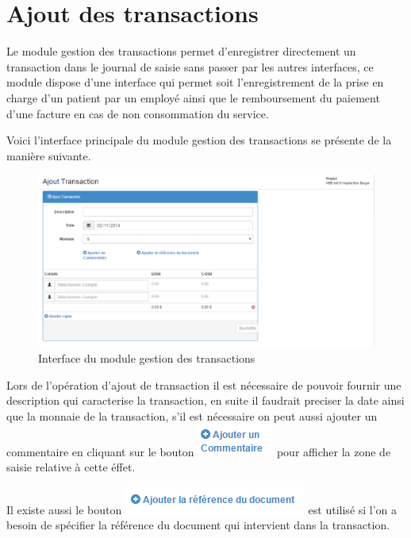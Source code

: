 \documentclass[12pt,a4paper]{report}
\begin{document}
\newpage
\section{Ajout des transactions}

Le module gestion des transactions permet d'enregistrer directement un transaction dans le journal de saisie sans passer par les autres interfaces, ce module dispose d'une interface qui permet soit l'enregistrement de la prise en charge d'un patient par un employé ainsi que le remboursement du paiement d'une facture en cas de non consommation du service.


Voici l'interface principale du module gestion des transactions se présente de la manière suivante. 
\begin{figure}[h]
\begin{center}
\includegraphics[width=12cm]{pic/AddTransaction.png}
\end{center}
\caption{Interface du module gestion des transactions}
\label{Interface du module gestion des transactions}
\end{figure}

Lors de l'opération d'ajout de transaction il est nécessaire de pouvoir fournir une description qui caracterise la transaction, en suite il faudrait preciser la date ainsi que la monnaie de la transaction, s'il est nécessaire on peut aussi ajouter un commentaire en cliquant sur le bouton \includegraphics[scale=0.7]{pic/AddComment.png} pour afficher la zone de saisie relative à cette éffet.

Il existe aussi le bouton \includegraphics[scale=0.7]{pic/AddRefDoc.png} est utilisé si l'on a besoin de spécifier la référence du document qui intervient dans la transaction. 
\end{document}
